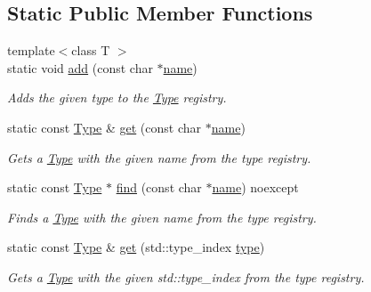 \subsection*{Static Public Member Functions}
\begin{DoxyCompactItemize}
\item 
{\footnotesize template$<$class T $>$ }\\static void \hyperlink{classdg_1_1deepcore_1_1_type_a50fd91c6f02c14e8ee2683e99783c329}{add} (const char $\ast$\hyperlink{classdg_1_1deepcore_1_1_type_afbf3ce3511318a804bff5f387dde55bb}{name})
\begin{DoxyCompactList}\small\item\em Adds the given type to the \hyperlink{classdg_1_1deepcore_1_1_type}{Type} registry. \end{DoxyCompactList}\item 
static const \hyperlink{classdg_1_1deepcore_1_1_type}{Type} \& \hyperlink{classdg_1_1deepcore_1_1_type_a91d379388e31f698a98fefbc3eb49d2e}{get} (const char $\ast$\hyperlink{classdg_1_1deepcore_1_1_type_afbf3ce3511318a804bff5f387dde55bb}{name})
\begin{DoxyCompactList}\small\item\em Gets a \hyperlink{classdg_1_1deepcore_1_1_type}{Type} with the given name from the type registry. \end{DoxyCompactList}\item 
static const \hyperlink{classdg_1_1deepcore_1_1_type}{Type} $\ast$ \hyperlink{classdg_1_1deepcore_1_1_type_aa142909be95af134c6edf1430de91ed7}{find} (const char $\ast$\hyperlink{classdg_1_1deepcore_1_1_type_afbf3ce3511318a804bff5f387dde55bb}{name}) noexcept
\begin{DoxyCompactList}\small\item\em Finds a \hyperlink{classdg_1_1deepcore_1_1_type}{Type} with the given name from the type registry. \end{DoxyCompactList}\item 
static const \hyperlink{classdg_1_1deepcore_1_1_type}{Type} \& \hyperlink{classdg_1_1deepcore_1_1_type_a5d8ff6968f0ccc58c8e8ed1057bd8bda}{get} (std\+::type\+\_\+index \hyperlink{classdg_1_1deepcore_1_1_type_a7448319c8cbc7f913a5e054f5aaba8ed}{type})
\begin{DoxyCompactList}\small\item\em Gets a \hyperlink{classdg_1_1deepcore_1_1_type}{Type} with the given {\ttfamily std\+::type\+\_\+index} from the type registry. \end{DoxyCompactList}\item 

\end{DoxyCompactItemize}

